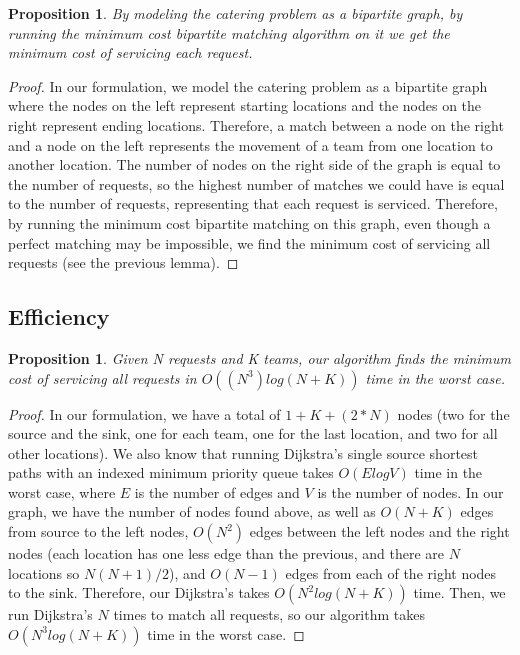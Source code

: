 \documentclass[12pt]{article}
\newtheorem{proposition}[theorem]{Proposition}
\begin{document}
\begin{proposition}
    By modeling the catering problem as a bipartite graph, by
    running the minimum cost bipartite matching algorithm on it
    we get the minimum cost of servicing each request.
\end{proposition}

\begin{proof}
    In our formulation, we model the catering problem as a
    bipartite graph where the nodes on the left represent
    starting locations and the nodes on the right represent
    ending locations. Therefore, a match between a node on
    the right and a node on the left represents the movement
    of a team from one location to another location. The
    number of nodes on the right side of the graph is equal
    to the number of requests, so the highest number of
    matches we could have is equal to the number of requests,
    representing that each request is serviced. Therefore,
    by running the minimum cost bipartite matching on this
    graph, even though a perfect matching may be impossible,
    we find the minimum cost of servicing all requests (see
    the previous lemma).
\end{proof}

\subsection{Efficiency}

\begin{proposition}
    Given N requests and K teams, our algorithm finds
    the minimum cost of servicing all requests in $O((N^3)
    log(N+K))$ time in the worst case.
\end{proposition}

\begin{proof}
    In our formulation, we have a total of $1 + K + (2 * N)$
    nodes (two for the source and the sink, one for each team,
    one for the last location, and two for all other locations).
    We also know that running Dijkstra's single source shortest
    paths with an indexed minimum priority queue takes $O(ElogV)$
    time in the worst case, where $E$ is the number of edges and
    $V$ is the number of nodes. In our graph, we have the number
    of nodes found above, as well as $O(N+K)$ edges from source
    to the left nodes, $O(N^2)$ edges between the left nodes
    and the right nodes (each location has one less edge than
    the previous, and there are $N$ locations so $N(N+1)/2$),
    and $O(N-1)$ edges from each of the right nodes to the sink.
    Therefore, our Dijkstra's takes $O(N^2 log(N+K))$ time. Then,
    we run Dijkstra's $N$ times to match all requests, so our
    algorithm takes $O(N^3 log(N+K))$ time in the worst case.
\end{proof}
\end{document}
